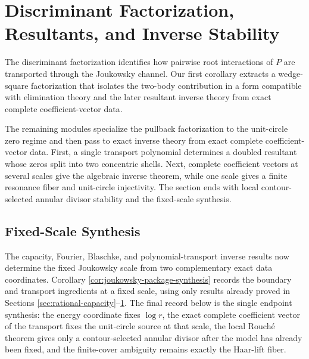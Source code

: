 \documentclass[12pt,a4paper]{article}
\theoremstyle{plain}
\theoremstyle{definition}
\numberwithin{equation}{section}
\begin{document}


\section{Discriminant Factorization, Resultants, and Inverse Stability}\label{sec:discriminant}

The discriminant factorization identifies how pairwise root interactions of \(P\) are transported through the Joukowsky channel. Our first corollary extracts a wedge-square factorization that isolates the two-body contribution in a form compatible with elimination theory and the later resultant inverse theory from exact complete coefficient-vector data.



The remaining modules specialize the pullback factorization to the
unit-circle zero regime and then pass to exact inverse theory from exact
complete coefficient-vector data.
First, a single transport polynomial determines a doubled resultant
whose zeros split into two concentric shells.  Next, complete
coefficient vectors at several scales give the algebraic inverse
theorem, while one scale gives a finite resonance fiber and unit-circle
injectivity.  The section ends with local contour-selected annular divisor stability and the
fixed-scale synthesis.



\subsection{Fixed-Scale Synthesis}\label{subsec:endpoint-synthesis}

The capacity, Fourier, Blaschke, and polynomial-transport inverse results
now determine the fixed Joukowsky scale from two complementary exact data
coordinates.  Corollary \ref{cor:joukowsky-package-synthesis} records the
boundary and transport ingredients at a fixed scale, using only results
already proved in Sections \ref{sec:rational-capacity}--\ref{sec:discriminant}.
The final record below is the single endpoint synthesis: the energy
coordinate fixes \(\log r\), the exact complete coefficient vector of the
transport fixes the unit-circle source at that scale, the local Rouch\'e
theorem gives only a contour-selected annular divisor after the model has
already been fixed, and the finite-cover ambiguity remains exactly the
Haar-lift fiber.
\end{document}
